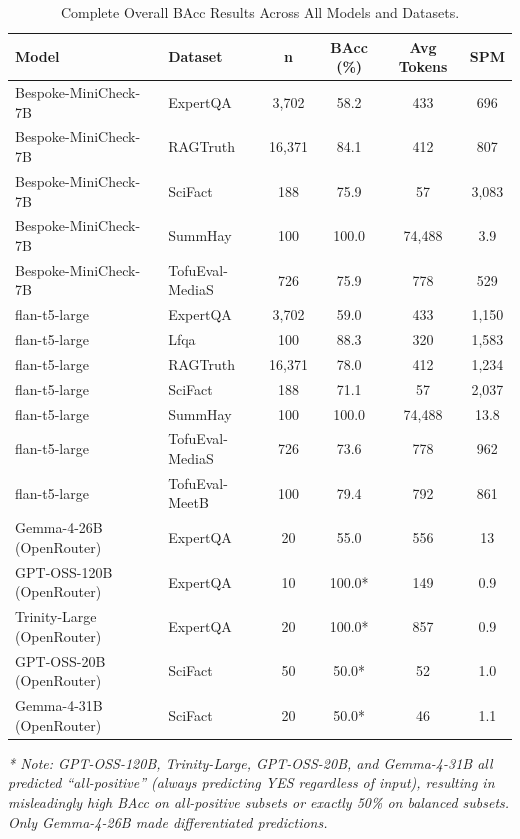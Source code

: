 \documentclass[12pt, letterpaper]{article}
\begin{document}
\begin{table}[H]
\centering
\caption{Complete Overall BAcc Results Across All Models and Datasets.}
\begin{tabular}{llcccc}
\toprule
\textbf{Model} & \textbf{Dataset} & \textbf{n} & \textbf{BAcc (\%)} & \textbf{Avg Tokens} & \textbf{SPM} \\
\midrule
Bespoke-MiniCheck-7B & ExpertQA & 3,702 & 58.2 & 433 & 696 \\
Bespoke-MiniCheck-7B & RAGTruth & 16,371 & 84.1 & 412 & 807 \\
Bespoke-MiniCheck-7B & SciFact & 188 & 75.9 & 57 & 3,083 \\
Bespoke-MiniCheck-7B & SummHay & 100 & 100.0 & 74,488 & 3.9 \\
Bespoke-MiniCheck-7B & TofuEval-MediaS & 726 & 75.9 & 778 & 529 \\
\midrule
flan-t5-large & ExpertQA & 3,702 & 59.0 & 433 & 1,150 \\
flan-t5-large & Lfqa & 100 & 88.3 & 320 & 1,583 \\
flan-t5-large & RAGTruth & 16,371 & 78.0 & 412 & 1,234 \\
flan-t5-large & SciFact & 188 & 71.1 & 57 & 2,037 \\
flan-t5-large & SummHay & 100 & 100.0 & 74,488 & 13.8 \\
flan-t5-large & TofuEval-MediaS & 726 & 73.6 & 778 & 962 \\
flan-t5-large & TofuEval-MeetB & 100 & 79.4 & 792 & 861 \\
\midrule
Gemma-4-26B (OpenRouter) & ExpertQA & 20 & 55.0 & 556 & 13 \\
GPT-OSS-120B (OpenRouter) & ExpertQA & 10 & 100.0* & 149 & 0.9 \\
Trinity-Large (OpenRouter) & ExpertQA & 20 & 100.0* & 857 & 0.9 \\
GPT-OSS-20B (OpenRouter) & SciFact & 50 & 50.0* & 52 & 1.0 \\
Gemma-4-31B (OpenRouter) & SciFact & 20 & 50.0* & 46 & 1.1 \\
\bottomrule
\end{tabular}
\end{table}
\addtocounter{table}{-1}
\addtocounter{table}{-1}
\vspace{-0.5em}
\textit{* Note: GPT-OSS-120B, Trinity-Large, GPT-OSS-20B, and Gemma-4-31B all predicted ``all-positive'' (always predicting YES regardless of input), resulting in misleadingly high BAcc on all-positive subsets or exactly 50\% on balanced subsets. Only Gemma-4-26B made differentiated predictions.}
\end{document}
